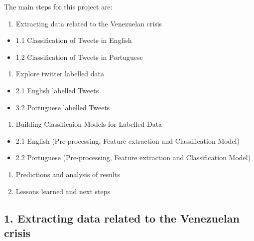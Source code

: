\documentclass[]{article}
\providecommand{\tightlist}{%
  \setlength{\itemsep}{0pt}\setlength{\parskip}{0pt}}
\begin{document}
The main steps for this project are:

\begin{enumerate}
\def\labelenumi{\arabic{enumi}.}
\tightlist
\item
  Extracting data related to the Venezuelan crisis
\end{enumerate}

\begin{itemize}
\tightlist
\item
  1.1 Classification of Tweets in English
\item
  1.2 Classification of Tweets in Portuguese
\end{itemize}

\begin{enumerate}
\def\labelenumi{\arabic{enumi}.}
\setcounter{enumi}{1}
\tightlist
\item
  Explore twitter labelled data
\end{enumerate}

\begin{itemize}
\tightlist
\item
  2.1 English labelled Tweets
\item
  3.2 Portuguese labelled Tweets
\end{itemize}

\begin{enumerate}
\def\labelenumi{\arabic{enumi}.}
\setcounter{enumi}{2}
\tightlist
\item
  Building Classificaion Models for Labelled Data
\end{enumerate}

\begin{itemize}
\tightlist
\item
  2.1 English (Pre-processing, Feature extraction and Classification
  Model)
\item
  2.2 Portuguese (Pre-processing, Feature extraction and Classification
  Model)
\end{itemize}

\begin{enumerate}
\def\labelenumi{\arabic{enumi}.}
\setcounter{enumi}{3}
\tightlist
\item
  Predictions and analysis of results
\item
  Lessons learned and next steps
\end{enumerate}

\subsection{1. Extracting data related to the Venezuelan
crisis}\label{extracting-data-related-to-the-venezuelan-crisis}
\end{document}

